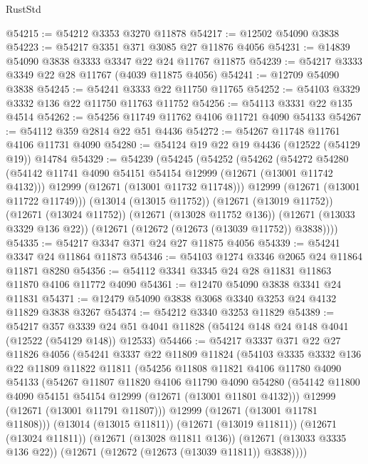 \begin{lexlean}{RustStd}
\begin{coremodule}
@54215 := @54212 @3353 @3270 @11878
@54217 := @12502 @54090 @3838
@54223 := @54217 @3351 @371 @3085 @27 @11876 @4056
@54231 := @14839 @54090 @3838 @3333 @3347 @22 @24 @11767 @11875
@54239 := @54217 @3333 @3349 @22 @28 @11767 (@4039 @11875 @4056)
@54241 := @12709 @54090 @3838
@54245 := @54241 @3333 @22 @11750 @11765
@54252 := @54103 @3329 @3332 @136 @22 @11750 @11763 @11752
@54256 := @54113 @3331 @22 @135 @4514
@54262 := @54256 @11749 @11762 @4106 @11721 @4090 @54133
@54267 := @54112 @359 @2814 @22 @51 @4436
@54272 := @54267 @11748 @11761 @4106 @11731 @4090
@54280 := @54124 @19 @22 @19 @4436 (@12522 (@54129 @19)) @14784
@54329 := @54239
    (@54245
      (@54252
        (@54262
          (@54272
            @54280
            (@54142 @11741 @4090 @54151 @54154 @12999 (@12671 (@13001 @11742 @4132)))
            @12999
            (@12671 (@13001 @11732 @11748)))
          @12999
          (@12671 (@13001 @11722 @11749)))
        (@13014 (@13015 @11752))
        (@12671 (@13019 @11752))
        (@12671 (@13024 @11752))
        (@12671 (@13028 @11752 @136))
        (@12671 (@13033 @3329 @136 @22))
        (@12671 (@12672 (@12673 (@13039 @11752)) @3838))))
@54335 := @54217 @3347 @371 @24 @27 @11875 @4056
@54339 := @54241 @3347 @24 @11864 @11873
@54346 := @54103 @1274 @3346 @2065 @24 @11864 @11871 @8280
@54356 := @54112 @3341 @3345 @24 @28 @11831 @11863 @11870 @4106 @11772 @4090
@54361 := @12470 @54090 @3838 @3341 @24 @11831
@54371 := @12479 @54090 @3838 @3068 @3340 @3253 @24 @4132 @11829 @3838 @3267
@54374 := @54212 @3340 @3253 @11829
@54389 := @54217
    @357
    @3339
    @24
    @51
    @4041
    @11828
    (@54124 @148 @24 @148 @4041 (@12522 (@54129 @148)) @12533)
@54466 := @54217
    @3337
    @371
    @22
    @27
    @11826
    @4056
    (@54241
      @3337
      @22
      @11809
      @11824
      (@54103
        @3335
        @3332
        @136
        @22
        @11809
        @11822
        @11811
        (@54256
          @11808
          @11821
          @4106
          @11780
          @4090
          @54133
          (@54267
            @11807
            @11820
            @4106
            @11790
            @4090
            @54280
            (@54142 @11800 @4090 @54151 @54154 @12999 (@12671 (@13001 @11801 @4132)))
            @12999
            (@12671 (@13001 @11791 @11807)))
          @12999
          (@12671 (@13001 @11781 @11808)))
        (@13014 (@13015 @11811))
        (@12671 (@13019 @11811))
        (@12671 (@13024 @11811))
        (@12671 (@13028 @11811 @136))
        (@12671 (@13033 @3335 @136 @22))
        (@12671 (@12672 (@12673 (@13039 @11811)) @3838))))

\end{coremodule}
\end{lexlean}
